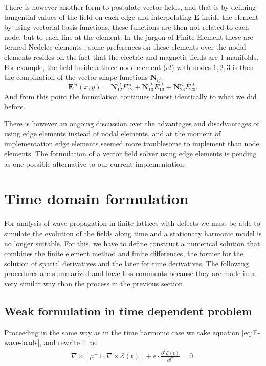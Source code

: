 There is  however another form to postulate vector fields, and that is by defining tangential values of the field on each edge and interpolating $\mathbf{E}$ inside the element by using vectorial basis functions, these functions are then not related to each node, but to each line at the element.  In the jargon of Finite Element these are termed Nedelec elements \cite{nedelec1980, kikuchi2001}, some preferences on these elements over the nodal elements resides on the fact that the electric and magnetic fields are 1-manifolds. For example, the field inside  a three node element ($el$) with nodes $1,2,3$ is then the combination of the vector shape functions $\mathbf{N}_{ij}$:
\begin{equation}
\mathbf{E}^{el}(x,y) =\mathbf{N}_{12}^{el}E_{12}^{el} + \mathbf{N}_{13}^{el}E_{13}^{el}+ \mathbf{N}_{23}^{el}E_{23}^{el}.
\end{equation}
And from this point the formulation continues almost identically to what we did before.

There is however an ongoing discussion \cite{Mur1994, Webb1993, Gerr1998} over the advantages and disadvantages of using edge elements instead of nodal elements, and at the moment of implementation edge elements seemed more troublesome to implement than node elements. The formulation of a vector field solver using edge elements is pending as one possible alternative to our current implementation.

\section{Time domain formulation}
For analysis of wave propagation in finite lattices with defects we must be able to simulate the evolution of the fields along time and a stationary harmonic model is no longer suitable. For this, we have to define construct a numerical solution that combines the finite element method and finite differences, the former for the solution of spatial derivatives and the later for time derivatives.
The following procedures are summarized and have less comments because they are made in a very similar way than the process in the previous section.

\subsection{Weak formulation in time dependent problem}
Proceeding in the same way as in the time harmonic case we take equation
\ref{eq:E-wave-loads}, and rewrite it as:
\begin{align}
\nabla\times\left[\mu^-1\cdot\nabla \times\mathcal{E}(t)\right] + \epsilon\cdot\frac{\partial^2 \mathcal{E}(t)}{\partial t^2}=0.
\end{align}

